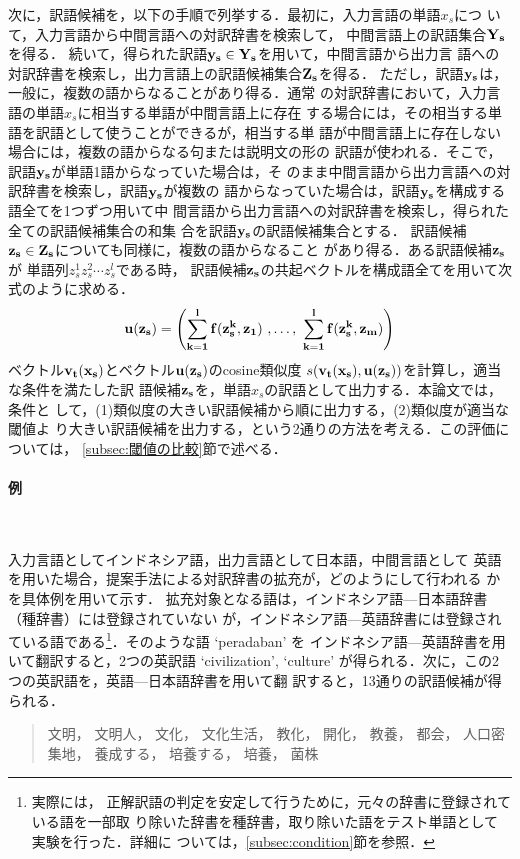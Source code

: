 \documentclass[japanese]{jnlp_1.4}
\begin{document}
次に，訳語候補を，以下の手順で列挙する．最初に，入力言語の単語$x_{s}$につ
いて，入力言語から中間言語への対訳辞書を検索して，
中間言語上の訳語集合$\bf{Y}_{s}$を得る．
続いて，得られた訳語$\bf{y}_{s}\in\bf{Y}_{s}$を用いて，中間言語から出力言
語への対訳辞書を検索し，出力言語上の訳語候補集合$\bf{Z}_{s}$を得る．
ただし，訳語$\bf{y}_{s}$は，一般に，複数の語からなることがあり得る．通常
の対訳辞書において，入力言語の単語$x_{s}$に相当する単語が中間言語上に存在
する場合には，その相当する単語を訳語として使うことができるが，相当する単
語が中間言語上に存在しない場合には，複数の語からなる句または説明文の形の
訳語が使われる．そこで，訳語$\bf{y}_{s}$が単語1語からなっていた場合は，そ
のまま中間言語から出力言語への対訳辞書を検索し，訳語$\bf{y}_{s}$が複数の
語からなっていた場合は，訳語$\bf{y}_{s}$を構成する語全てを1つずつ用いて中
間言語から出力言語への対訳辞書を検索し，得られた全ての訳語候補集合の和集
合を訳語$\bf{y}_{s}$の訳語候補集合とする．
訳語候補$\bf{z}_{s}\in \bf{Z}_{s}$についても同様に，複数の語からなること
があり得る．ある訳語候補$\bf{z}_{s}$が
単語列$z_{s}^{1}z_{s}^{2}\cdots{}z_{s}^{l}$である時，
訳語候補$\bf{z}_{s}$の共起ベクトルを構成語全てを用いて次式のように求める．
\begin{equation}
  \bf{u}(\bf{z}_{s}) = \left(\sum_{k=1}^{l}f(z_{s}^{k},z_{1})\
				,\ldots,\ \sum_{k=1}^{l}f(z_{s}^{k},z_{m})\right)
    \label{eq:dst_vector}
\end{equation}
ベクトル$\bf{v}_{t}(x_{s})$とベクトル$\bf{u}(\bf{z}_{s})$のcosine類似度
$s(\bf{v}_{t}(x_{s}),\bf{u}(\bf{z}_{s}))$を計算し，適当な条件を満たした訳
語候補$\bf{z}_{s}$を，単語$x_{s}$の訳語として出力する．本論文では，条件と
して，(1)類似度の大きい訳語候補から順に出力する，(2)類似度が適当な閾値よ
り大きい訳語候補を出力する，という2通りの方法を考える．この評価については，
\ref{subsec:閾値の比較}節で述べる．

\paragraph{例}\

入力言語としてインドネシア語，出力言語として日本語，中間言語として
英語を用いた場合，提案手法による対訳辞書の拡充が，どのようにして行われる
かを具体例を用いて示す．
拡充対象となる語は，インドネシア語—日本語辞書（種辞書）には登録されていない
が，インドネシア語—英語辞書には登録されている語である\footnote{実際には，
正解訳語の判定を安定して行うために，元々の辞書に登録されている語を一部取
り除いた辞書を種辞書，取り除いた語をテスト単語として実験を行った．詳細に
ついては，\ref{subsec:condition}節を参照．}．そのような語 `peradaban' を
インドネシア語—英語辞書を用いて翻訳すると，2つの英訳語 `civilization', 
`culture' が得られる．次に，この2つの英訳語を，英語—日本語辞書を用いて翻
訳すると，13通りの訳語候補が得られる．
\begin{quote}
  文明，
  文明人，
  文化，
  文化生活，
  教化，
  開化，
  教養，
  都会，
  人口密集地，
  養成する，
  培養する，
  培養，
  菌株
\end{quote}
\end{document}
